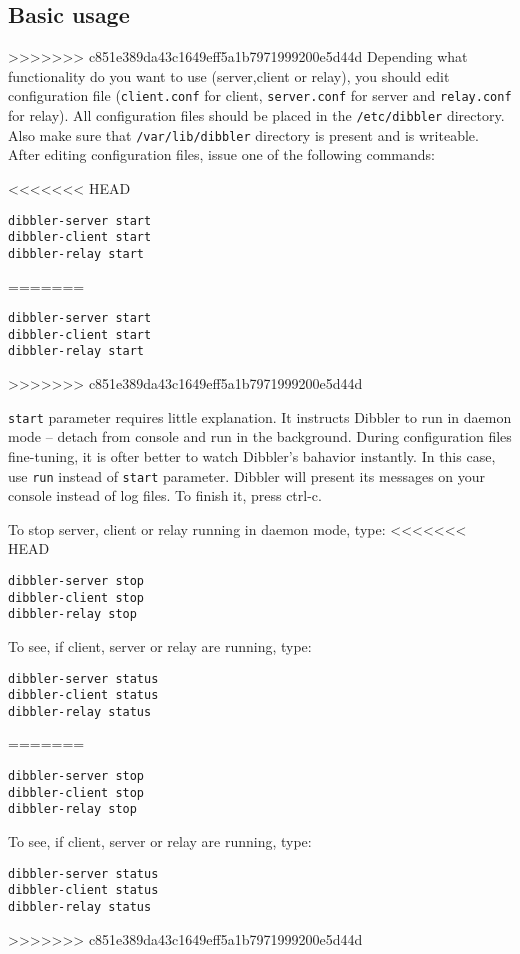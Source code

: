\subsection{Basic usage}
>>>>>>> c851e389da43c1649eff5a1b7971999200e5d44d
Depending what functionality do you want to use (server,client or relay),
you should edit configuration file (\verb+client.conf+ for client, \verb+server.conf+
for server and \verb+relay.conf+ for relay). All configuration files should
be placed in the \verb+/etc/dibbler+ directory. Also make sure that
\verb+/var/lib/dibbler+ directory is present and is writeable. After
editing configuration files, issue one of the following commands:

<<<<<<< HEAD
\begin{verbatim}
dibbler-server start
dibbler-client start
dibbler-relay start
\end{verbatim}
=======
\begin{lstlisting}
dibbler-server start
dibbler-client start
dibbler-relay start
\end{lstlisting}
>>>>>>> c851e389da43c1649eff5a1b7971999200e5d44d

\verb+start+ parameter requires little explanation. It
instructs Dibbler to run in daemon mode -- detach from console and run
in the background. During configuration files fine-tuning, it is ofter better
to watch Dibbler's bahavior instantly. In this case, use \verb+run+
instead of \verb+start+ parameter. Dibbler will present its messages on
your console instead of log files. To finish it, press ctrl-c.

To stop server, client or relay running in daemon mode, type:
<<<<<<< HEAD
\begin{verbatim}
dibbler-server stop
dibbler-client stop
dibbler-relay stop
\end{verbatim}

To see, if client, server or relay are running, type:

\begin{verbatim}
dibbler-server status
dibbler-client status
dibbler-relay status
\end{verbatim}
=======
\begin{lstlisting}
dibbler-server stop
dibbler-client stop
dibbler-relay stop
\end{lstlisting}

To see, if client, server or relay are running, type:

\begin{lstlisting}
dibbler-server status
dibbler-client status
dibbler-relay status
\end{lstlisting}
>>>>>>> c851e389da43c1649eff5a1b7971999200e5d44d

